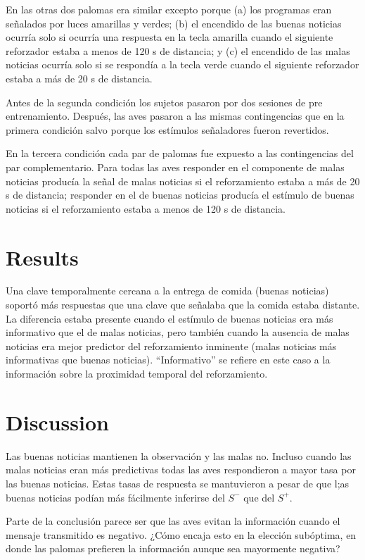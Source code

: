 \documentclass[a4paper,12pt]{article}
\begin{document}
En las otras dos palomas era similar excepto porque (a) los programas eran señalados por luces amarillas y verdes; (b) el encendido de las buenas noticias ocurría solo si ocurría una respuesta en la tecla amarilla cuando el siguiente reforzador estaba a menos de 120 s de distancia; y (c) el encendido de las malas noticias ocurría solo si se respondía a la tecla verde cuando el siguiente reforzador estaba a más de 20 s de distancia.

Antes de la segunda condición los sujetos pasaron por dos sesiones de pre entrenamiento.
Después, las aves pasaron a las mismas contingencias que en la primera condición salvo porque los estímulos señaladores fueron revertidos.

En la tercera condición cada par de palomas fue expuesto a las contingencias del par complementario.
Para todas las aves responder en el componente de malas noticias producía la señal de malas noticias si el reforzamiento estaba a más de 20 s de distancia; responder en el de buenas noticias producía el estímulo de buenas noticias si el reforzamiento estaba a menos de 120 s de distancia.

\section{Results}

Una clave temporalmente cercana a la entrega de comida (buenas noticias) soportó más respuestas que una clave que señalaba que la comida estaba distante.
La diferencia estaba presente cuando el estímulo de buenas noticias era más informativo que el de malas noticias, pero también cuando la ausencia de malas noticias era mejor predictor del reforzamiento inminente (malas noticias más informativas que buenas noticias).
``Informativo'' se refiere en este caso a la información sobre la proximidad temporal del reforzamiento.

\section{Discussion}

Las buenas noticias mantienen la observación y las malas no.
Incluso cuando las malas noticias eran más predictivas todas las aves respondieron a mayor tasa por las buenas noticias.
Estas tasas de respuesta se mantuvieron a pesar de que l;as buenas noticias podían más fácilmente inferirse del $S^{-}$ que del $S^{+}$.

Parte de la conclusión parece ser que las aves evitan la información cuando el mensaje transmitido es negativo.
¿Cómo encaja esto en la elección subóptima, en donde las palomas prefieren la información aunque sea mayormente negativa?
\end{document}
